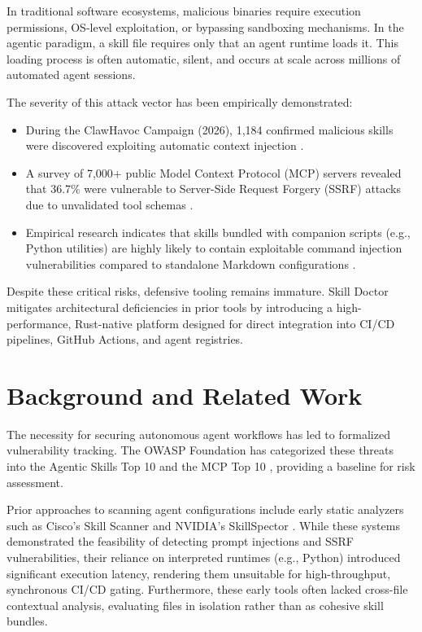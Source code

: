 \documentclass[11pt,letterpaper]{article}
\begin{document}
In traditional software ecosystems, malicious binaries require execution permissions, OS-level exploitation, or bypassing sandboxing mechanisms. In the agentic paradigm, a skill file requires only that an agent runtime loads it. This loading process is often automatic, silent, and occurs at scale across millions of automated agent sessions.

The severity of this attack vector has been empirically demonstrated:
\begin{itemize}
    \item During the ClawHavoc Campaign (2026), 1,184 confirmed malicious skills were discovered exploiting automatic context injection \cite{clawhavoc2026}.
    \item A survey of 7,000+ public Model Context Protocol (MCP) servers revealed that 36.7\% were vulnerable to Server-Side Request Forgery (SSRF) attacks due to unvalidated tool schemas \cite{bluerock2026}.
    \item Empirical research indicates that skills bundled with companion scripts (e.g., Python utilities) are highly likely to contain exploitable command injection vulnerabilities compared to standalone Markdown configurations \cite{nvidia2026}.
\end{itemize}

Despite these critical risks, defensive tooling remains immature. Skill Doctor mitigates architectural deficiencies in prior tools by introducing a high-performance, Rust-native platform designed for direct integration into CI/CD pipelines, GitHub Actions, and agent registries.

\section{Background and Related Work}

The necessity for securing autonomous agent workflows has led to formalized vulnerability tracking. The OWASP Foundation has categorized these threats into the Agentic Skills Top 10 \cite{owasp2026} and the MCP Top 10 \cite{owaspmcp2026}, providing a baseline for risk assessment.

Prior approaches to scanning agent configurations include early static analyzers such as Cisco's Skill Scanner \cite{cisco2026} and NVIDIA's SkillSpector \cite{nvidia2026}. While these systems demonstrated the feasibility of detecting prompt injections and SSRF vulnerabilities, their reliance on interpreted runtimes (e.g., Python) introduced significant execution latency, rendering them unsuitable for high-throughput, synchronous CI/CD gating. Furthermore, these early tools often lacked cross-file contextual analysis, evaluating files in isolation rather than as cohesive skill bundles.
\end{document}
